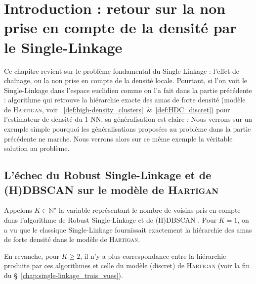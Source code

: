 \chapter{Introduction : retour sur la non prise en compte de la densité par le Single-Linkage}

Ce chapitre revient sur le problème fondamental du Single-Linkage : l'effet de chaînage, ou la non prise en compte de la densité locale.
Pourtant, si l'on voit le Single-Linkage dans l'espace euclidien comme on l'a fait dans la partie précédente : algorithme qui retrouve la hiérarchie exacte des amas de forte densité (modèle de \textsc{Hartigan}, voir \Def~\ref{def:high-density_clusters}~\&~\ref{def:HDC_discret}) pour l'estimateur de densité du $1$-NN, sa généralisation est claire :
Nous verrons sur un exemple simple pourquoi les généralisations proposées au problème dans la partie précédente ne marche. 
Nous verrons alors sur ce même exemple la véritable solution au problème.





\section{L'échec du Robust Single-Linkage et de (H)DBSCAN sur le modèle de \textsc{Hartigan}}

Appelons $K\in \mathbb N^\star$ la variable représentant le nombre de voisins pris en compte dans l'algorithme de Robust Single-Linkage \cite{RobustSingleLinkage2010} et de (H)DBSCAN \cite{HDBSCAN, HDBSCAN2017}.
Pour $K = 1$, on a vu que le classique Single-Linkage fournissait exactement la hiérarchie des amas de forte densité dans le modèle de \textsc{Hartigan}.

En revanche, pour $K\ge2$, il n'y a plus correspondance entre la hiérarchie produite par ces algorithmes et celle du modèle (discret) de \textsc{Hartigan} (voir la fin du \S~\ref{chap:single-linkage_trois_vues}). 

